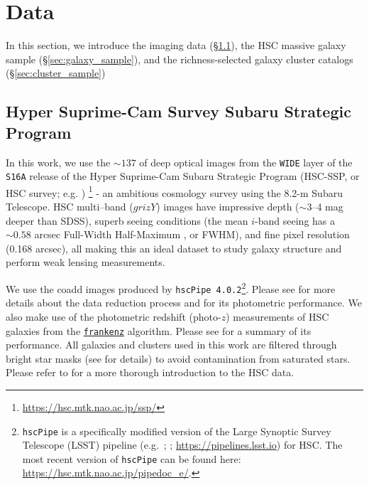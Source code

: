 \documentclass[fleqn,usenatbib,useAMS,english]{mnras}
\begin{document}
\section{Data}
    \label{sec:data}

    In this section, we introduce the imaging data  (\S \ref{sec:hsc}), the HSC massive
    galaxy sample (\S \ref{sec:galaxy_sample}), and the richness-selected galaxy cluster
    catalogs (\S \ref{sec:cluster_sample})

\subsection{Hyper Suprime-Cam Survey Subaru Strategic Program}
    \label{sec:hsc}

    In this work, we use the $\sim 137$ \sqdeg{} of deep optical images from the \texttt{WIDE}
    layer of the \texttt{S16A} release of the Hyper Suprime-Cam Subaru Strategic Program
    (HSC-SSP, or HSC survey; e.g. \citealt{HSC-SSP, HSC-DR1, HSC-DR2})
    \footnote{\url{https://hsc.mtk.nao.ac.jp/ssp/}} - an ambitious cosmology survey using the
    8.2-m Subaru Telescope.
    HSC multi--band ($grizY$) images have impressive depth ($\sim$3--4 mag deeper than
    SDSS), superb seeing conditions (the mean $i$-band seeing has a $\sim 0.58$ arcsec Full-Width
    Half-Maximum , or FWHM), and fine pixel resolution (0.168 arcsec), all making this an ideal
    dataset to study galaxy structure and perform weak lensing measurements.

    We use the coadd images produced by \texttt{hscPipe 4.0.2}\footnote{
        \texttt{hscPipe} is a specifically modified version of the Large Synoptic Survey
        Telescope (LSST) pipeline (e.g.\ \citealt{Juric2015}; \citealt{Axelrod2010};
        {\url{https://pipelines.lsst.io}}) for HSC.
        The most recent version of \texttt{hscPipe} can be found here:
        \url{https://hsc.mtk.nao.ac.jp/pipedoc_e/}.
    }.
    Please see \citet{HSC-PIPE} for more details about the data reduction process and
    \citet{SynPipe} for its photometric performance.
    We also make use of the photometric redshift (photo-$z$) measurements of HSC galaxies from
    the \href{https://github.com/joshspeagle/frankenz}{\texttt{frankenz}}
    \citep{Speagle2019} algorithm. Please see \citet{HSC-PHOTOZ} for a summary of its
    performance.
    All galaxies and clusters used in this work are filtered through bright star masks
    (see \citealt{HSC-STAR} for details) to avoid contamination from saturated stars. Please
    refer to \citet{Huang2018b, Huang2018c, Huang2020} for a more thorough introduction to the
    HSC data.
\end{document}

